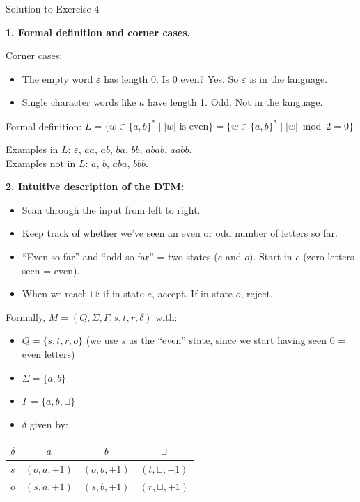 \documentclass[11pt,a4paper]{article}
\newcommand{\blank}{\sqcup}
\newcommand{\fitmath}[1]{\begin{adjustbox}{max width=\linewidth}$\displaystyle #1$\end{adjustbox}}
\begin{document}
\begin{solutionbox}{Solution to Exercise 4}

\textbf{1. Formal definition and corner cases.}

Corner cases:
\begin{itemize}
    \item The empty word $\varepsilon$ has length 0. Is 0 even? Yes. So $\varepsilon$ is in the language.
    \item Single character words like $a$ have length 1. Odd. Not in the language.
\end{itemize}

Formal definition:
\fitmath{L = \{w \in \{a,b\}^* \mid |w| \text{ is even}\} = \{w \in \{a,b\}^* \mid |w| \bmod 2 = 0\}}

Examples in $L$: $\varepsilon$, $aa$, $ab$, $ba$, $bb$, $abab$, $aabb$.\\
Examples not in $L$: $a$, $b$, $aba$, $bbb$.

\medskip
\textbf{2. Intuitive description of the DTM:}

\begin{itemize}
    \item Scan through the input from left to right.
    \item Keep track of whether we've seen an even or odd number of letters so far.
    \item ``Even so far'' and ``odd so far'' = two states ($e$ and $o$). Start in $e$ (zero letters seen = even).
    \item When we reach $\blank$: if in state $e$, accept. If in state $o$, reject.
\end{itemize}

Formally, $M = (Q, \Sigma, \Gamma, s, t, r, \delta)$ with:
\begin{itemize}
    \item $Q = \{s, t, r, o\}$ (we use $s$ as the ``even'' state, since we start having seen 0 = even letters)
    \item $\Sigma = \{a, b\}$
    \item $\Gamma = \{a, b, \blank\}$
    \item $\delta$ given by:
\end{itemize}

\begin{center}
\begin{tabular}{c|c|c|c}
$\delta$ & $a$ & $b$ & $\blank$ \\
\hline
$s$ & $(o, a, +1)$ & $(o, b, +1)$ & $(t, \blank, +1)$ \\
$o$ & $(s, a, +1)$ & $(s, b, +1)$ & $(r, \blank, +1)$ \\
\end{tabular}
\end{center}


\end{solutionbox}
\end{document}

